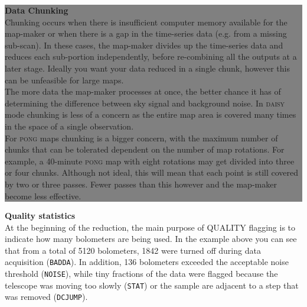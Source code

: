 \documentclass[twoside,11pt]{article}
\newenvironment{latexonly}{}{}
\renewcommand{\_}{\texttt{\symbol{95}}}
\begin{document}
\begin{latexonly}
\colorbox{gray}{
\label{page:text}
\hspace{0.1cm}
\begin{minipage}[t]{0.93\linewidth}
\vspace{0.2cm}

\textbf{Data Chunking}\\
Chunking occurs when there is insufficient computer memory available
for the map-maker or when there is a gap in the time-series data (e.g.
from a missing sub-scan). In these cases, the map-maker divides up the
time-series data and reduces each sub-portion independently, before
re-combining all the outputs at a later stage. Ideally you want your
data reduced in a single chunk, however this can be unfeasible for
large maps.
\vspace{0.2cm}\\
The more data the map-maker processes at once, the better chance it
has of determining the difference between sky signal and background
noise. In \textsc{daisy} mode chunking is less of a concern as
the entire map area is covered many times in the space of a single
observation.
\vspace{0.2cm}\\
For \textsc{pong} maps chunking is a bigger concern, with the
maximum number of chunks that can be tolerated dependent on the number
of map rotations. For example, a 40-minute \textsc{pong} map with eight
rotations may get divided into three or four chunks. Although not
ideal, this will mean that each point is still covered by two or three
passes. Fewer passes than this however and the map-maker become less
effective.
\vspace{0.2cm}
\end{minipage}
\hspace{0.1cm}
}
\newline\newline\newline
\end{latexonly}

\textbf{Quality statistics}\\
At the beginning of the reduction, the main purpose of QUALITY
flagging is to indicate how many bolometers are being used. In the
example above you can see that from a total of 5120 bolometers, 1842
were turned off during data acquisition (\texttt{BADDA}). In addition,
136 bolometers
exceeded the acceptable noise threshold (\texttt{NOISE}), while tiny
fractions of the data were flagged because the telescope was moving
too slowly (\texttt{STAT}) or the sample are adjacent to a step that
was removed (\texttt{DCJUMP}).
\end{document}
